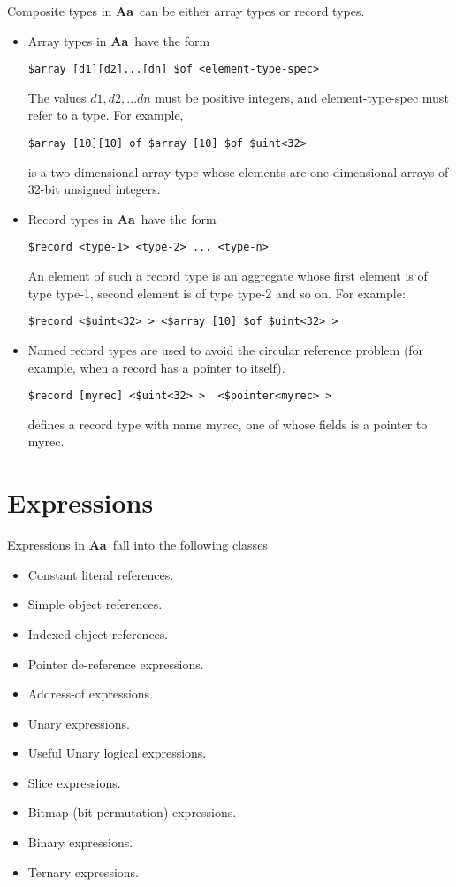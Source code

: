 \documentclass{article}
\newcommand{\Aa}{{\bf Aa}~}
\begin{document}
Composite types in \Aa can be either
array types or record types.
\begin{itemize}
\item 
Array types in \Aa have the form
\begin{verbatim}
$array [d1][d2]...[dn] $of <element-type-spec>
\end{verbatim} %
The values $ d1,d2, \ldots dn$ must
be positive integers, and element-type-spec
must refer to a type.
For example, 
\begin{verbatim}
$array [10][10] of $array [10] $of $uint<32>
\end{verbatim}
is a two-dimensional array type whose
elements are one dimensional arrays of 32-bit
unsigned integers.
\item
Record types in \Aa have the form
\begin{verbatim}
$record <type-1> <type-2> ... <type-n>
\end{verbatim}
An element of such a record type is
an aggregate whose first element is of type
type-1, second element is of type type-2 and so on.
For example:
\begin{verbatim}
$record <$uint<32> > <$array [10] $of $uint<32> > 
\end{verbatim}
\item Named record types are used to avoid the circular
reference problem (for example, when a record has a pointer to
itself).
\begin{verbatim}
$record [myrec] <$uint<32> >  <$pointer<myrec> >
\end{verbatim}
defines a record type with name myrec, one of whose
fields is a pointer to myrec.
\end{itemize}



\section{Expressions} \label{sec:Expressions}


Expressions in \Aa fall into the following classes
\begin{itemize}
\item Constant literal references.
\item Simple object references.
\item Indexed object references.
\item Pointer de-reference expressions.
\item Address-of expressions.
\item Unary expressions.
\item Useful Unary logical expressions.
\item Slice expressions.
\item Bitmap (bit permutation) expressions.
\item Binary expressions.
\item Ternary expressions.
\end{itemize}
\end{document}
